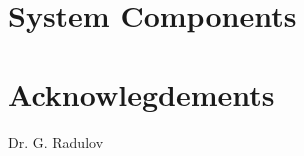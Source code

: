 


\begingroup
\obeylines

\endgroup

\IEEEpeerreviewmaketitle

\IEEEpubidadjcol

\begingroup
\obeylines

\endgroup

\begingroup
\obeylines

\endgroup

\section{System Components}

\begingroup
\obeylines

\endgroup

\begingroup
\obeylines

\endgroup

\begingroup
\obeylines

\endgroup

\begingroup
\obeylines

\endgroup

\begingroup
\obeylines

\endgroup

\section*{Acknowlegdements}
Dr. G. Radulov




\begingroup
\obeylines

\endgroup

